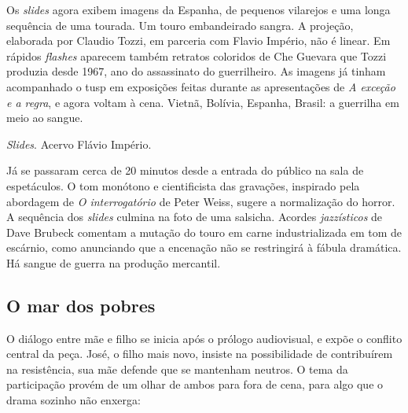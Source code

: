 Os {\it slides} agora exibem imagens da Espanha, de pequenos vilarejos e
uma longa sequência de uma tourada. Um touro embandeirado sangra. A
projeção, elaborada por Claudio Tozzi, em parceria com Flavio Império,
não é linear. Em rápidos {\it flashes} aparecem também retratos
coloridos de Che Guevara que Tozzi produzia desde 1967, ano do
assassinato do guerrilheiro. As imagens já tinham acompanhado o {\sc tusp} em
exposições feitas durante as apresentações de {\it A exceção e a regra},
e agora voltam à cena. Vietnã, Bolívia, Espanha, Brasil: a guerrilha em
meio ao sangue.

{}%
{}%
{}%
{}%
{}%
{}%
{}%
{}%
{}%
{}%
{}%
{}%

{\it Slides}. Acervo Flávio Império.

Já se passaram cerca de 20 minutos desde a entrada do público na sala de
espetáculos. O tom monótono e cientificista das gravações, inspirado
pela abordagem de {\it O interrogatório} de Peter Weiss, sugere a
normalização do horror. A sequência dos {\it slides} culmina na foto de
uma salsicha. Acordes {\it jazzísticos} de Dave Brubeck comentam a
mutação do touro em carne industrializada em tom de escárnio, como
anunciando que a encenação não se restringirá à fábula dramática. Há
sangue de guerra na produção mercantil.

\subsection{O mar dos pobres}

O diálogo entre mãe e filho se inicia após o prólogo audiovisual, e
expõe o conflito central da peça. José, o filho mais novo, insiste na
possibilidade de contribuírem na resistência, sua mãe defende que se
mantenham neutros. O tema da participação provém de um olhar de ambos
para fora de cena, para algo que o drama sozinho não enxerga:

